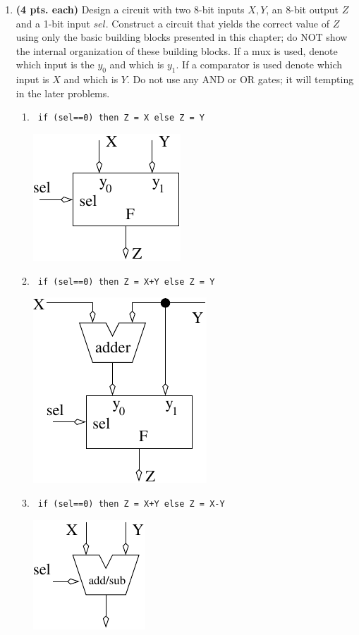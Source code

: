 \begin{enumerate}
\item {\bf (4 pts. each)} Design a circuit with two 8-bit inputs $X,Y$, an 
8-bit output $Z$ and a 1-bit input $sel$.  Construct a circuit that yields the 
correct value of $Z$ using only the basic building blocks presented in this 
chapter; do NOT show the internal organization of these building blocks.  If 
a mux is used, denote which input is the $y_0$ and which is $y_1$.  
If a comparator is used denote which input is $X$ and which is $Y$.
Do not use any AND or OR gates; it will tempting in the later problems.
\begin{enumerate}
\item \verb^ if (sel==0) then Z = X else Z = Y ^

\begin{solution}{ 
\includegraphics{./FigHw4/Sol4-8a}
} \end{solution}

\item \verb^ if (sel==0) then Z = X+Y else Z = Y ^

\begin{solution}{ 
\includegraphics{./FigHw4/Sol4-8b}
} \end{solution}

\item \verb^ if (sel==0) then Z = X+Y else Z = X-Y ^

\begin{solution}{
\includegraphics{./FigHw4/Sol4-8c}
} \end{solution}


\end{enumerate}
\end{enumerate}
